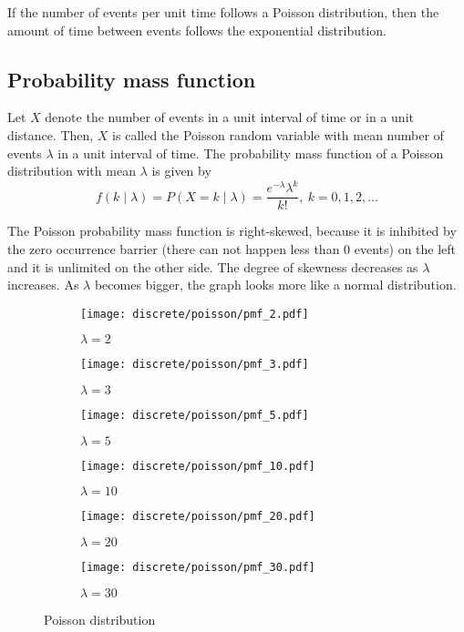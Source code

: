 If the number of events per unit time follows a Poisson distribution, then the amount of time between events follows the exponential distribution.

\subsection{Probability mass function}
Let $X$ denote the number of events in a unit interval of time or in a unit distance. Then, $X$ is called the Poisson random variable with mean number of events $\lambda$ in a unit interval of time. The probability mass function of a Poisson distribution with mean $\lambda$ is given by
\[
 	f(k \mid \lambda) = P(X = k \mid \lambda) = \frac{e^{-\lambda} \lambda^k}{k!}, \ k = 0, 1, 2, \ldots
\]

The Poisson probability mass function is right-skewed, because it is inhibited by the zero occurrence barrier (there can not happen less than 0 events) on the left and it is unlimited on the other side.
The degree of skewness decreases as $\lambda$ increases. As $\lambda$ becomes bigger, the graph looks more like a normal distribution.

\begin{figure}[H]
	\centering
	\begin{subfigure}[b]{0.45\textwidth}
		\texttt{[image: discrete/poisson/pmf\_2.pdf]}
		\caption{$\lambda = 2$}
	\end{subfigure}
	\begin{subfigure}[b]{0.45\textwidth}
		\texttt{[image: discrete/poisson/pmf\_3.pdf]}
		\caption{$\lambda = 3$}
	\end{subfigure}
	\begin{subfigure}[b]{0.45\textwidth}
		\texttt{[image: discrete/poisson/pmf\_5.pdf]}
		\caption{$\lambda = 5$}
	\end{subfigure}
	\begin{subfigure}[b]{0.45\textwidth}
		\texttt{[image: discrete/poisson/pmf\_10.pdf]}
		\caption{$\lambda = 10$}
	\end{subfigure}
	\begin{subfigure}[b]{0.45\textwidth}
		\texttt{[image: discrete/poisson/pmf\_20.pdf]}
		\caption{$\lambda = 20$}
	\end{subfigure}
	\begin{subfigure}[b]{0.45\textwidth}
		\texttt{[image: discrete/poisson/pmf\_30.pdf]}
		\caption{$\lambda = 30$}
	\end{subfigure}
	\caption{Poisson distribution}
\end{figure}

